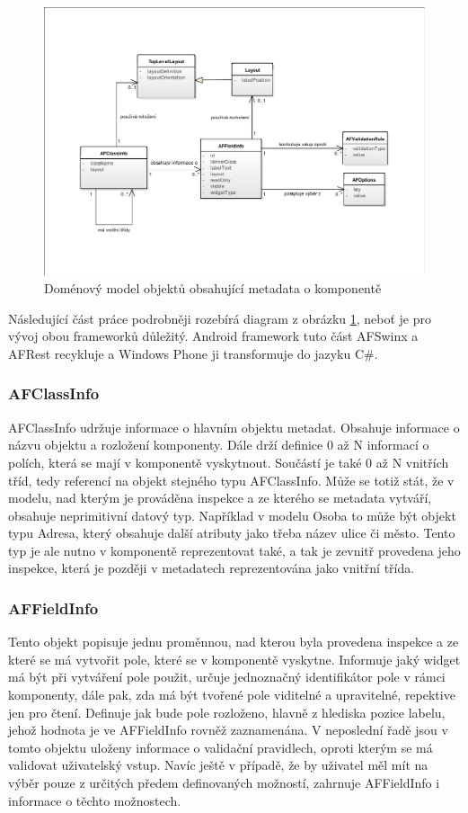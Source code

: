 \begin{figure}[h!]
\includegraphics[width=\textwidth]{figures/domainModel}
\caption{Doménový model objektů obsahující metadata o komponentě}
\label{img:metadataModel}
\end{figure}

Následující část práce podrobněji rozebírá diagram z obrázku \ref{img:metadataModel}, neboť je pro vývoj obou frameworků důležitý. Android framework tuto část AFSwinx a AFRest recykluje a Windows Phone ji transformuje do jazyku C\#.
\subsubsection{AFClassInfo}
AFClassInfo udržuje informace o hlavním objektu metadat. Obsahuje informace o názvu objektu a rozložení komponenty. Dále drží definice 0 až N informací o polích, která se mají v komponentě vyskytnout. Součástí je také 0 až N vnitřích tříd, tedy referencí na objekt stejného typu AFClassInfo. Může se totiž stát, že v modelu, nad kterým je prováděna inspekce a ze kterého se metadata vytváří, obsahuje neprimitivní datový typ. Například v modelu Osoba to může být objekt typu Adresa, který obsahuje další atributy jako třeba název ulice či město. Tento typ je ale nutno v komponentě reprezentovat také, a tak je zevnitř provedena jeho inspekce, která je později v metadatech reprezentována jako vnitřní třída. 

\subsubsection{AFFieldInfo}
Tento objekt popisuje jednu proměnnou, nad kterou byla provedena inspekce a ze které se má vytvořit pole, které se v komponentě vyskytne. Informuje jaký widget má být při vytváření pole použit, určuje jednoznačný identifikátor pole v rámci komponenty, dále pak, zda má být tvořené pole viditelné a upravitelné, repektive jen pro čtení. Definuje jak bude pole rozloženo, hlavně z hlediska pozice labelu, jehož hodnota je ve AFFieldInfo rovněž zaznamenána. V neposlední řadě jsou v tomto objektu uloženy informace o validační pravidlech, oproti kterým se má validovat uživatelský vstup. Navíc ještě v případě, že by uživatel měl mít na výběr pouze z určitých předem definovaných možností, zahrnuje AFFieldInfo i informace o těchto možnostech. 

